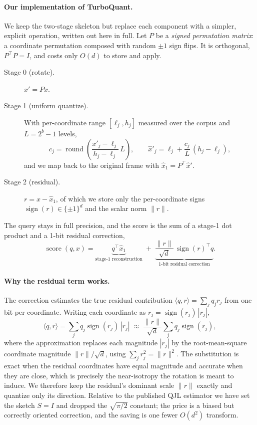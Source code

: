 \documentclass[11pt]{article}
\begin{document}
\paragraph{Our implementation of TurboQuant.} We keep the two-stage skeleton but replace each component with a simpler, explicit operation, written out here in full. Let $P$ be a \emph{signed permutation matrix}: a coordinate permutation composed with random $\pm1$ sign flips. It is orthogonal, $P^\top P = I$, and costs only $O(d)$ to store and apply.
\begin{description}
  \item[Stage 0 (rotate).] $x' = P x$.
  \item[Stage 1 (uniform quantize).] With per-coordinate range $[\ell_j, h_j]$ measured over the corpus and $L = 2^{b} - 1$ levels,
  \begin{equation}
  c_j = \operatorname{round}\!\left(\frac{x'_j - \ell_j}{h_j - \ell_j}\,L\right), \qquad \hat{x}'_j = \ell_j + \frac{c_j}{L}\,(h_j - \ell_j),
  \end{equation}
  and we map back to the original frame with $\hat{x}_1 = P^\top \hat{x}'$.
  \item[Stage 2 (residual).] $r = x - \hat{x}_1$, of which we store only the per-coordinate signs $\operatorname{sign}(r) \in \{\pm1\}^d$ and the scalar norm $\|r\|$.
\end{description}
The query stays in full precision, and the score is the sum of a stage-1 dot product and a 1-bit residual correction,
\begin{equation}
\operatorname{score}(q, x) = \underbrace{q^\top \hat{x}_1}_{\text{stage-1 reconstruction}} \;+\; \underbrace{\frac{\|r\|}{\sqrt{d}}\,\operatorname{sign}(r)^\top q}_{\text{1-bit residual correction}}.
\end{equation}

\paragraph{Why the residual term works.} The correction estimates the true residual contribution $\langle q, r\rangle = \sum_j q_j r_j$ from one bit per coordinate. Writing each coordinate as $r_j = \operatorname{sign}(r_j)\,|r_j|$,
\begin{equation}
\langle q, r\rangle = \sum_j q_j \operatorname{sign}(r_j)\,|r_j| \;\approx\; \frac{\|r\|}{\sqrt{d}}\sum_j q_j \operatorname{sign}(r_j),
\end{equation}
where the approximation replaces each magnitude $|r_j|$ by the root-mean-square coordinate magnitude $\|r\|/\sqrt{d}$, using $\sum_j r_j^2 = \|r\|^2$. The substitution is exact when the residual coordinates have equal magnitude and accurate when they are close, which is precisely the near-isotropy the rotation is meant to induce. We therefore keep the residual's dominant scale $\|r\|$ exactly and quantize only its direction. Relative to the published QJL estimator we have set the sketch $S = I$ and dropped the $\sqrt{\pi/2}$ constant; the price is a biased but correctly oriented correction, and the saving is one fewer $O(d^2)$ transform.
\end{document}
